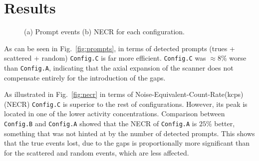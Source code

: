 \documentclass{IEEEtran}
\begin{document}
\vspace{-0.2cm}

\section{Results}
\begin{figure}
    \vspace{-0.2cm}
    
    \centering
    \caption{(a) Prompt events (b) NECR for each configuration.}
    
    \vspace{-0.2cm}
\end{figure}

As can be seen in Fig.~\ref{fig:prompts}, in terms of detected prompts (trues + scattered + random) \texttt{Config.C} is far more efficient. \texttt{Config.C} was $\approx 8\%$ worse than \texttt{Config.A}, indicating that the axial expansion of the scanner does not compensate entirely for the introduction of the gaps. 

As illustrated in Fig.~\ref{fig:necr} in terms of Noise-Equivalent-Count-Rate(kcps) (NECR) \texttt{Config.C} is superior to the rest of configurations. However, its peak is located in one of the lower activity concentrations. Comparison between \texttt{Config.B} and \texttt{Config.A} showed that the NECR of \texttt{Config.A} is $25\%$ better, something that was not hinted at by the number of detected prompts. This shows that the true events lost, due to the gaps is proportionally more significant than for the scattered and random events, which are less affected.
\end{document}
